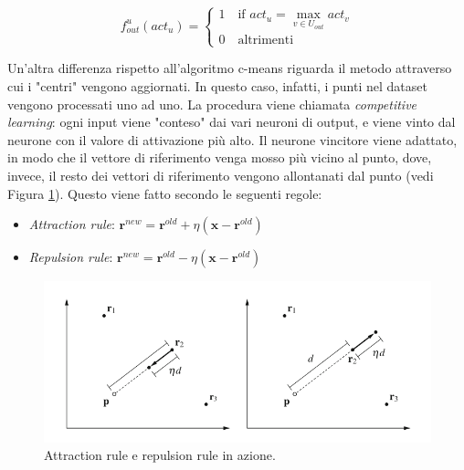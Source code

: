 \documentclass[10pt,a4paper]{article}
\begin{document}
$$
f^u_{out} (act_u) = \begin{cases}
					1 \quad \text{if } act_u = \max_{v \in U_{out}} act_v\\
					0 \quad \text{altrimenti}
					\end{cases}
$$

Un'altra differenza rispetto all'algoritmo c-means riguarda il metodo attraverso cui i "centri" vengono aggiornati. In questo caso, infatti, i punti nel dataset vengono processati uno ad uno. La procedura viene chiamata \emph{competitive learning}: ogni input viene "conteso" dai vari neuroni di output, e viene vinto dal neurone con il valore di attivazione più alto. Il neurone vincitore viene adattato, in modo che il vettore di riferimento venga mosso più vicino al punto, dove, invece, il resto dei vettori di riferimento vengono allontanati dal punto (vedi Figura \ref{fig:19}). Questo viene fatto secondo le seguenti regole:

\begin{itemize}
\item{\emph{Attraction rule}: $
\mathbf{r}^{new} = \mathbf{r}^{old} + \eta(\mathbf{x} - \mathbf{r}^{old})
$} 
\item{\emph{Repulsion rule}: $
\mathbf{r}^{new} = \mathbf{r}^{old} - \eta(\mathbf{x} - \mathbf{r}^{old})
$} 
\end{itemize}

\begin{figure}
\centering
\includegraphics[scale=0.4]{img/adapt.png}
\caption{Attraction rule e repulsion rule in azione.}
\label{fig:19}
\end{figure}
\end{document}
